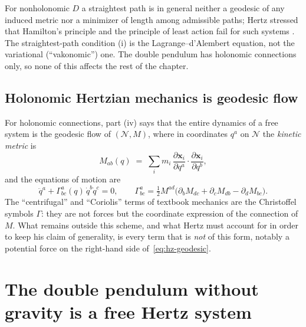 \begin{remark}
For nonholonomic $D$ a straightest path is in general neither a geodesic of
any induced metric nor a minimizer of length among admissible paths; Hertz
stressed that Hamilton's principle and the principle of least action fail for
such systems \cite{hdp:lutzen2005}. The straightest-path condition (i) is the
Lagrange--d'Alembert equation, not the variational (``vakonomic'') one. The
double pendulum has holonomic connections only, so none of this affects the
rest of the chapter.
\end{remark}

\subsection{Holonomic Hertzian mechanics is geodesic flow}

For holonomic connections, part (iv) says that the entire dynamics of a free
system is the geodesic flow of $(\mathcal N,M)$, where in coordinates
$q^a$ on $\mathcal N$ the \emph{kinetic metric} is
\begin{equation}\label{eq:hz-kinetic-metric}
  M_{ab}(q)\;=\;\sum_i m_i\,\frac{\partial\mathbf x_i}{\partial q^a}\!\cdot\frac{\partial\mathbf x_i}{\partial q^b},
\end{equation}
and the equations of motion are
\begin{equation}\label{eq:hz-geodesic}
  \ddot q^a+\Gamma^a_{bc}(q)\,\dot q^b\dot q^c=0 ,
  \qquad
  \Gamma^a_{bc}=\tfrac12M^{ad}\bigl(\partial_bM_{dc}+\partial_cM_{db}-\partial_dM_{bc}\bigr).
\end{equation}
The ``centrifugal'' and ``Coriolis'' terms of textbook mechanics are the
Christoffel symbols $\Gamma$: they are not forces but the coordinate
expression of the connection of $M$. What remains outside this scheme, and what
Hertz must account for in order to keep his claim of generality, is every
term that is \emph{not} of this form, notably a potential force on the
right-hand side of~\eqref{eq:hz-geodesic}.

\section{The double pendulum without gravity is a free Hertz system}
\label{sec:hz-free-dp}

